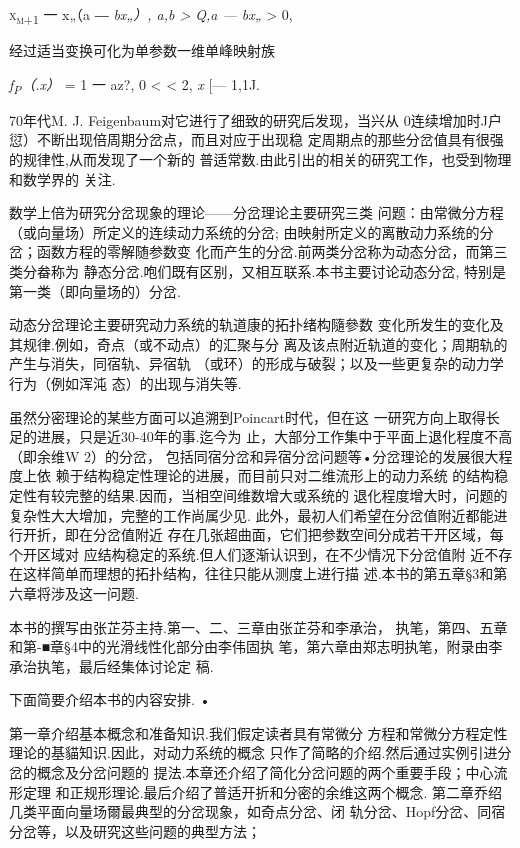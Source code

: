 \documentclass{article}
\begin{document}
\textsc{x\textsubscript{m+1}} 一 x„（a ― \emph{bx„）, a,b \textgreater{}
Q,a --- bx„} \textgreater{} 0,

经过适当变换可化为单参数一维单峰映射族

\emph{f\textsubscript{P}（.x）} = 1 一 az?, 0 \textless{} \textless{} 2,
\emph{x} {[}--- 1,1J.

70年代M. J. Feigenbaum对它进行了细致的研究后发现，当兴从
0连续增加时J户愆）不断出现倍周期分岔点，而且对应于出现稳
定周期点的那些分岔值具有很强的规律性,从而发现了一个新的
普适常数.由此引出的相关的研究工作，也受到物理和数学界的 关注.

数学上倍为研究分岔现象的理论------分岔理论主要研究三类
问题：由常微分方程（或向量场）所定义的连续动力系统的分岔;
由映射所定义的离散动力系统的分岔；函数方程的零解随参数变
化而产生的分岔.前两类分岔称为动态分岔，而第三类分畚称为
静态分岔.咆们既有区别，又相互联系.本书主要讨论动态分岔,
特别是第一类（即向量场的）分岔.

动态分岔理论主要研究动力系统的轨道康的拓扑绪构隨參数
变化所发生的变化及其规律.例如，奇点（或不动点）的汇聚与分
离及该点附近轨道的变化；周期轨的产生与消失，同宿轨、异宿轨
（或环）的形成与破裂；以及一些更复杂的动力学行为（例如浑沌
态）的出现与消失等.

虽然分密理论的某些方面可以追溯到Poincart时代，但在这
一研究方向上取得长足的进展，只是近30-40年的事.迄今为
止，大部分工作集中于平面上退化程度不高（即余维W 2）的分岔，
包括同宿分岔和异宿分岔问题等•分岔理论的发展很大程度上依
赖于结构稳定性理论的进展，而目前只对二维流形上的动力系统
的结构稳定性有较完整的结果.因而，当相空间维数增大或系统的
退化程度增大时，问题的复杂性大大增加，完整的工作尚属少见.
此外，最初人们希望在分岔值附近都能进行开折，即在分岔值附近
存在几张超曲面，它们把参数空间分成若干开区域，每个开区域对
应结构稳定的系统.但人们逐渐认识到，在不少情况下分岔值附
近不存在这样简单而理想的拓扑结构，往往只能从测度上进行描
述.本书的第五章§3和第六章将涉及这一问题.

本书的撰写由张芷芬主持.第一、二、三章由张芷芬和李承治，
执笔，第四、五章和第-■章§4中的光滑线性化部分由李伟固执
笔，第六章由郑志明执笔，附录由李承治执笔，最后经集体讨论定 稿.

下面简要介绍本书的内容安排. •

第一章介绍基本概念和准备知识.我们假定读者具有常微分
方程和常微分方程定性理论的基貓知识.因此，对动力系统的概念
只作了简略的介绍.然后通过实例引进分岔的概念及分岔问题的
提法.本章还介绍了简化分岔问题的两个重要手段；中心流形定理
和正规形理论.最后介绍了普适开折和分密的余维这两个概念.
第二章乔绍几类平面向量场爾最典型的分岔现象，如奇点分岔、闭
轨分岔、Hopf分岔、同宿分岔等，以及研究这些问题的典型方法；
\end{document}
